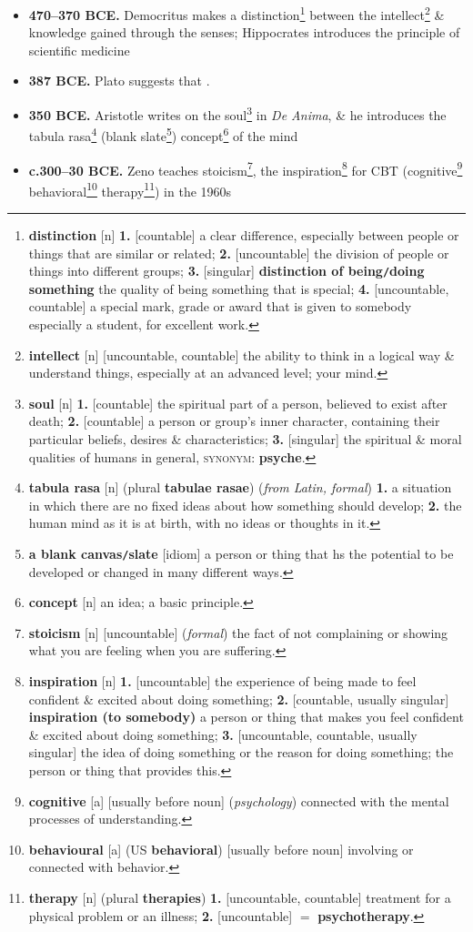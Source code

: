 \documentclass[oneside]{book}
\numberwithin{equation}{section}
\begin{document}
\begin{itemize}
	\item \textbf{470--370 BCE.} Democritus makes a distinction\footnote{\textbf{distinction} [n] \textbf{1.} [countable] a clear difference, especially between people or things that are similar or related; \textbf{2.} [uncountable] the division of people or things into different groups; \textbf{3.} [singular] \textbf{distinction of being\texttt{/}doing something} the quality of being something that is special; \textbf{4.} [uncountable, countable] a special mark, grade or award that is given to somebody especially a student, for excellent work.} between the intellect\footnote{\textbf{intellect} [n] [uncountable, countable] the ability to think in a logical way \& understand things, especially at an advanced level; your mind.} \& knowledge gained through the senses; Hippocrates introduces the principle of scientific medicine
	\item \textbf{387 BCE.} Plato suggests that .
	\item \textbf{350 BCE.} Aristotle writes on the soul\footnote{\textbf{soul} [n] \textbf{1.} [countable] the spiritual part of a person, believed to exist after death; \textbf{2.} [countable] a person or group's inner character, containing their particular beliefs, desires \& characteristics; \textbf{3.} [singular] the spiritual \& moral qualities of humans in general, \textsc{synonym}: \textbf{psyche}.} in \textit{De Anima}, \& he introduces the tabula rasa\footnote{\textbf{tabula rasa} [n] (plural \textbf{tabulae rasae}) (\textit{from Latin, formal}) \textbf{1.} a situation in which there are no fixed ideas about how something should develop; \textbf{2.} the human mind as it is at birth, with no ideas or thoughts in it.} (blank slate\footnote{\textbf{a blank canvas\texttt{/}slate} [idiom] a person or thing that hs the potential to be developed or changed in many different ways.}) concept\footnote{\textbf{concept} [n] an idea; a basic principle.} of the mind
	\item \textbf{c.300--30 BCE.} Zeno teaches stoicism\footnote{\textbf{stoicism} [n] [uncountable] (\textit{formal}) the fact of not complaining or showing what you are feeling when you are suffering.}, the inspiration\footnote{\textbf{inspiration} [n] \textbf{1.} [uncountable] the experience of being made to feel confident \& excited about doing something; \textbf{2.} [countable, usually singular] \textbf{inspiration (to somebody)} a person or thing that makes you feel confident \& excited about doing something; \textbf{3.} [uncountable, countable, usually singular] the idea of doing something or the reason for doing something; the person or thing that provides this.} for CBT (cognitive\footnote{\textbf{cognitive} [a] [usually before noun] (\textit{psychology}) connected with the mental processes of understanding.} behavioral\footnote{\textbf{behavioural} [a] (US \textbf{behavioral}) [usually before noun] involving or connected with behavior.} therapy\footnote{\textbf{therapy} [n] (plural \textbf{therapies}) \textbf{1.} [uncountable, countable] treatment for a physical problem or an illness; \textbf{2.} [uncountable] $=$ \textbf{psychotherapy}.}) in the 1960s

\end{itemize}
\end{document}
